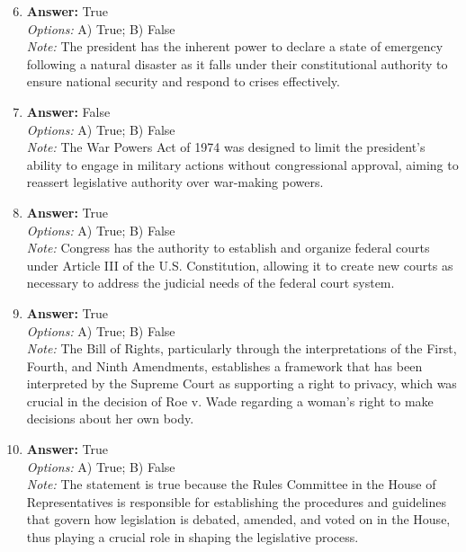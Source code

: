 \documentclass[12pt]{article}
\begin{document}
\begin{enumerate}[label=\arabic*.]
\setcounter{enumi}{5}
\item \textbf{Answer:} True
\\ \textit{Options:} A) True; B) False
\\ \textit{Note:} The president has the inherent power to declare a state of emergency following a natural disaster as it falls under their constitutional authority to ensure national security and respond to crises effectively.
\item \textbf{Answer:} False
\\ \textit{Options:} A) True; B) False
\\ \textit{Note:} The War Powers Act of 1974 was designed to limit the president's ability to engage in military actions without congressional approval, aiming to reassert legislative authority over war-making powers.
\item \textbf{Answer:} True
\\ \textit{Options:} A) True; B) False
\\ \textit{Note:} Congress has the authority to establish and organize federal courts under Article III of the U.S. Constitution, allowing it to create new courts as necessary to address the judicial needs of the federal court system.
\item \textbf{Answer:} True
\\ \textit{Options:} A) True; B) False
\\ \textit{Note:} The Bill of Rights, particularly through the interpretations of the First, Fourth, and Ninth Amendments, establishes a framework that has been interpreted by the Supreme Court as supporting a right to privacy, which was crucial in the decision of Roe v. Wade regarding a woman's right to make decisions about her own body.
\item \textbf{Answer:} True
\\ \textit{Options:} A) True; B) False
\\ \textit{Note:} The statement is true because the Rules Committee in the House of Representatives is responsible for establishing the procedures and guidelines that govern how legislation is debated, amended, and voted on in the House, thus playing a crucial role in shaping the legislative process.
\end{enumerate}
\end{document}
